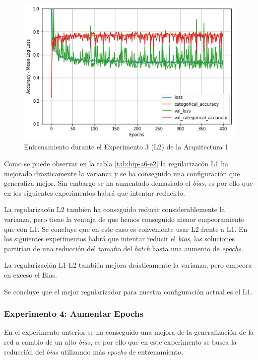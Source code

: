 \documentclass{article}
\begin{document}
   \begin{figure}[!h]
				\begin{center}
					\includegraphics[scale=0.5]{tr-a6-e3.1.png}		
					\caption{Entrenamiento durante el Experimento 3 (L2) de la Arquitectura 1}	
					\label{tab:tr-a6-e3}
				\end{center}
			\end{figure}
    Como se puede observar en la tabla \ref{tab:hip-a6-e2} la regularizac\'on L1 ha mejorado drasticamente la varianza y se ha conseguido una configuraci\'on que generaliza mejor. Sin embargo se ha aumentado demasiado el \textit{bias}, es por ello que en los siguientes experimentos habr\'a que intentar reducirlo. 
    
           La regularizac\'on L2 tambien ha conseguido reducir considerablemente la varianza, pero tiene la ventaja de que hemos conseguido menor empeoramiento que con L1. Se concluye que en este caso es conveniente usar L2 frente a L1. En los siguientes experimentos habr\'a que intentar reducir el \textit{bias}, las soluciones partir\'ian de una reducci\'on del tama\~{n}o del \textit{batch} hasta una aumento de \textit{epochs}. 
           
  La regularizaci\'on L1-L2 tambi\'en mejora dr\'asticamente la varianza, pero empeora en exceso el Bias. 

  Se concluye que el mejor regularizador para nuestra configuraci\'on actual es el L1. 
  
   

   
        \subsubsection{Experimento 4: Aumentar Epochs}
        En el experimento anterior se ha conseguido una mejora de la generalizaci\'on de la red a cambio de un alto \textit{bias}, es por ello que en este experimento se busca la reducci\'on del \textit{bias} utilizando m\'as \textit{epochs} de entrenamiento. 
        
\end{document}
